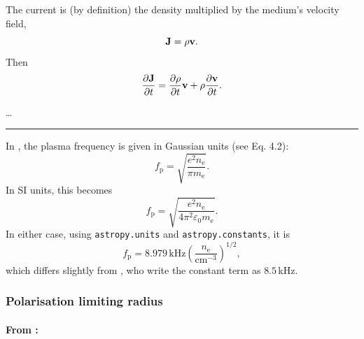 \documentclass{book}
\newcommand{\pd}[2]{\frac{\partial {#1}}{\partial {#2}}}
\begin{document}
The current is (by definition) the density multiplied by the medium's velocity field,
\begin{equation}
    {\bf J} = \rho {\bf v}.
\end{equation}
Then
\begin{equation}
    \pd{\bf J}{t} = \pd{\rho}{t} {\bf v} + \rho\pd{\bf v}{t}.
\end{equation}

\dots

\noindent\rule{\textwidth}{1pt}

In \citet{Lorimer2005}, the plasma frequency is given in Gaussian units (see Eq. 4.2):
\begin{equation}
    f_\text{p} = \sqrt{\frac{e^2 n_\text{e}}{\pi m_\text{e}}}.
\end{equation}
In SI units, this becomes
\begin{equation}
    f_\text{p} = \sqrt{\frac{e^2 n_\text{e}}{4\pi^2\varepsilon_0 m_\text{e}}}.
\end{equation}
In either case, using \texttt{astropy.units} and \texttt{astropy.constants}, it is
\begin{equation}
    f_\text{p} = 8.979\,\text{kHz} \left(\frac{n_\text{e}}{\text{cm}^{-3}}\right)^{1/2},
\end{equation}
which differs slightly from \citeauthor{Lorimer2005}, who write the constant term as $8.5\,$kHz.

\subsubsection{Polarisation limiting radius}

\paragraph{From \citet{Barnard1986}:}
\end{document}
